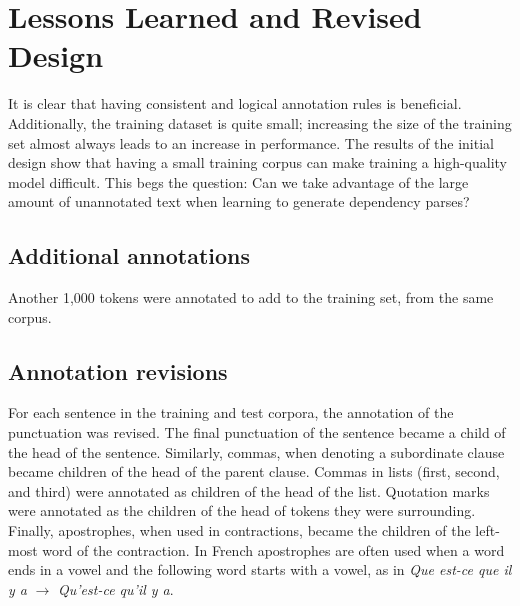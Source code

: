 \documentclass[11pt,letterpaper]{article}
\begin{document}
\section{Lessons Learned and Revised Design}
It is clear that having consistent and logical annotation rules is beneficial. Additionally, the training dataset is quite small; increasing the size of the training set almost always leads to an increase in performance. The results of the initial design show that having a small training corpus can make training a high-quality model difficult. This begs the question: Can we take advantage of the large amount of unannotated text when learning to generate dependency parses? 
\subsection{Additional annotations}
Another 1,000 tokens were annotated to add to the training set, from the same corpus.
\subsection{Annotation revisions}
For each sentence in the training and test corpora, the annotation of the punctuation was revised. The final punctuation of the sentence became a child of the head of the sentence. Similarly, commas, when denoting a subordinate clause became children of the head of the parent clause. Commas in lists (first, second, and third) were annotated as children of the head of the list. Quotation marks were annotated as the children of the head of tokens they were surrounding. Finally, apostrophes, when used in contractions, became the children of the left-most word of the contraction. In French apostrophes are often used when a word ends in a vowel and the following word starts with a vowel, as in \textit{Que est-ce que il y a} $\rightarrow$ \textit{Qu'est-ce qu'il y a}. 
\end{document}
